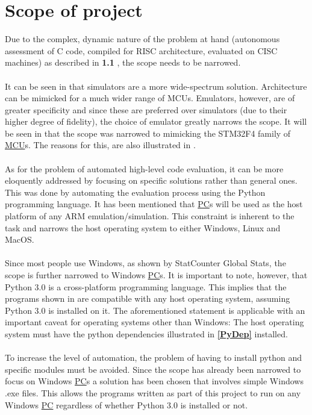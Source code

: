 \section{Scope of project}
\label{scOfWrk}
Due to the complex, dynamic nature of the problem at hand (autonomous assessment of C code, compiled for RISC architecture, evaluated on CISC machines) as described in \textbf{1.1 }, the scope needs to be narrowed. 
\\\\
It can be seen in \textbf{} that simulators are a more wide-spectrum solution. Architecture can be mimicked for a much wider range of MCUs. Emulators, however, are of greater specificity and since these are preferred over simulators (due to their higher degree of fidelity), the choice of emulator greatly narrows the scope. It will be seen in   \textbf{} that the scope was narrowed to mimicking the STM32F4 family of \hyperref[listAbr]{MCU}s. The reasons for this, are also illustrated in \textbf{}.
\\\\
As for the problem of automated high-level code evaluation, it can be more eloquently addressed by focusing on specific solutions rather than general ones. This was done by automating the evaluation process using the Python programming language. It has been mentioned that \hyperref[listAbr]{PC}s will be used as the host platform of any ARM emulation/simulation. This constraint is inherent to the task and narrows the host operating system to either Windows, Linux and MacOS.
\\\\
Since most people use Windows, as shown by StatCounter Global Stats, the scope is further narrowed to Windows \hyperref[listAbr]{PC}s. It is important to note, however, that Python 3.0 is a cross-platform programming language. This implies that the programs shown in \textbf{} are compatible with any host operating system, assuming Python 3.0 is installed on it. The aforementioned statement is applicable with an important caveat for operating systems other than Windows: The host operating system must have the python dependencies illustrated in \textbf{\ref{PyDep} } installed.
\\\\
To increase the level of automation, the problem of having to install python and specific modules must be avoided. Since the scope has already been narrowed to focus on Windows \hyperref[listAbr]{PC}s a solution has been chosen that involves simple Windows .exe files. This allows the programs written as part of this project to run on any Windows \hyperref[listAbr]{PC} regardless of whether Python 3.0 is installed or not.
